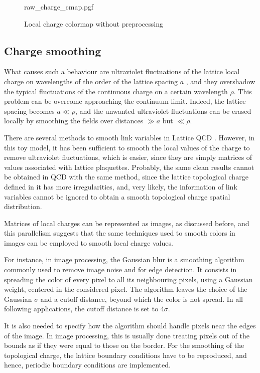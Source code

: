 \begin{figure}[!htb]
	\centering
    {raw_charge_cmap.pgf}
    \caption{Local charge colormap without preprocessing}
    \label{fig:raw_charge_cmap}
\end{figure}

\subsection*{Charge smoothing}

What causes such a behaviour are ultraviolet fluctuations of the lattice local charge on wavelengths of the order of the lattice spacing $a$ \cite{teper:1985},
and they overshadow the typical fluctuations of the continuous charge on a certain wavelength $\rho$. 
This problem can be overcome approaching the continuum limit. Indeed, the lattice spacing becomes $a\ll\rho$,
and the unwanted ultraviolet fluctuations can be erased locally by smoothing the fields over distances $\gg a$ but $\ll \rho$.

There are several methods to smooth link variables in Lattice QCD \cite{bonati-delia:2014}.
However, in this toy model, %
it has been sufficient to smooth the local values of the charge to remove ultraviolet fluctuations,
which is easier, since they are simply matrices of values associated with lattice plaquettes.
Probably, the same clean results cannot be obtained in QCD with the same method,
since the lattice topological charge defined in it has more irregularities,
and, very likely, the information of link variables cannot be ignored to obtain a smooth topological charge spatial distribution.

Matrices of local charges can be represented as images, as discussed before,
and this parallelism suggests that the same techniques used to smooth colors in images can be employed to smooth local charge values.

For instance, in image processing, the Gaussian blur is a smoothing algorithm commonly used to remove image noise and for edge detection.
It consists in spreading the color of every pixel to all its neighbouring pixels, using a Gaussian weight, centered in the considered pixel.
The algorithm leaves the choice of the Gaussian $\sigma$ and a cutoff distance, beyond which the color is not spread.
In all following applications, the cutoff distance is set to $4\sigma$.

It is also needed to specify how the algorithm should handle pixels near the edges of the image.
In image processing, this is usually done treating pixels out of the bounds as if they were equal to those on the border.
For the smoothing of the topological charge, the lattice boundary conditions have to be reproduced,
and hence, periodic boundary conditions are implemented.


